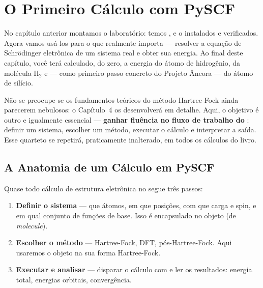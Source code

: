 \chapter{O Primeiro Cálculo com PySCF}
\label{cap:primeiro}

No capítulo anterior montamos o laboratório: temos \python{}, \numpy{} e o
\pyscf{} instalados e verificados. Agora vamos usá-los para o que realmente
importa --- resolver a equação de Schrödinger eletrônica de um sistema real e
obter sua energia. Ao final deste capítulo, você terá calculado, do zero, a
energia do átomo de hidrogênio, da molécula H$_2$ e --- como primeiro passo
concreto do Projeto Âncora --- do átomo de silício.

Não se preocupe se os fundamentos teóricos do método Hartree-Fock ainda
parecerem nebulosos: o Capítulo~4 os desenvolverá em detalhe. Aqui, o objetivo é
outro e igualmente essencial --- \textbf{ganhar fluência no fluxo de trabalho do
\pyscf{}}: definir um sistema, escolher um método, executar o cálculo e
interpretar a saída. Esse quarteto se repetirá, praticamente inalterado, em todos
os cálculos do livro.

\section{A Anatomia de um Cálculo em PySCF}
\label{sec:anatomia}

Quase todo cálculo de estrutura eletrônica no \pyscf{} segue três passos:

\begin{enumerate}[leftmargin=*]
  \item \textbf{Definir o sistema} --- que átomos, em que posições, com que carga
        e spin, e em qual conjunto de funções de base. Isso é encapsulado no
        objeto  (de \emph{molecule}).
  \item \textbf{Escolher o método} --- Hartree-Fock, DFT, pós-Hartree-Fock. Aqui
        usaremos o objeto  na sua forma Hartree-Fock.
  \item \textbf{Executar e analisar} --- disparar o cálculo com  e
        ler os resultados: energia total, energias orbitais, convergência.
\end{enumerate}

